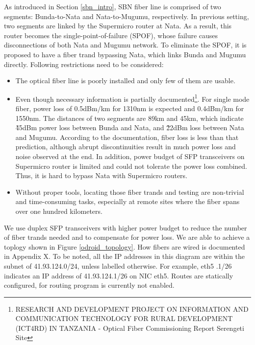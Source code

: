 As introduced in Section \ref{sbn_intro}, SBN fiber line is comprised of two segments: Bunda-to-Nata and Nata-to-Mugumu, respectively. In previous setting, two segments are linked by the Supermicro router at Nata. As a result, this router becomes the single-point-of-failure (SPOF), whose failure causes disconnections of both Nata and Mugumu network. To eliminate the SPOF, it is proposed to have a fiber trand bypassing Nata, which links Bunda and Mugumu directly. Following restrictions need to be considered:
\begin{itemize}
\item The optical fiber line is poorly installed and only few of them are usable.
\item Even though necessary information is partially documented\footnote{RESEARCH AND DEVELOPMENT PROJECT ON INFORMATION AND COMMUNICATION TECHNOLOGY FOR RURAL DEVELOPMENT (ICT4RD) IN TANZANIA - Optical Fiber Commissioning Report Serengeti Site}. For single mode fiber, power loss of 0.5dBm/km for 1310nm is expected and 0.4dBm/km for 1550nm. The distances of two segments are 89km and 45km, which indicate \~45dBm power loss between Bunda and Nata, and \~22dBm loss between Nata and Mugumu. According to the documentation, fiber loss is less than that prediction, although abrupt discontinuities result in much power loss and noise observed at the end. In addition, power budget of SFP transceivers on Supermicro router is limited and could not tolerate the power loss combined. Thus, it is hard to bypass Nata with Supermicro routers.
\item Without proper tools, locating those fiber trands and testing are non-trivial and time-consuming tasks, especially at remote sites where the fiber spans over one hundred kilometers.
\end{itemize}
We use duplex SFP transceivers with higher power budget to reduce the number of fiber trands needed and to compensate for power loss. We are able to achieve a toplogy shown in Figure \ref{odroid_topology}. How fibers are wired is documented in Appendix X. To be noted, all the IP addresses in this diagram are within the subnet of 41.93.124.0/24, unless  labelled otherwise. For example, eth5 .1/26 indicates an IP address of 41.93.124.1/26 on NIC eth5. Routes are statically configured, for routing program is currently not enabled.

